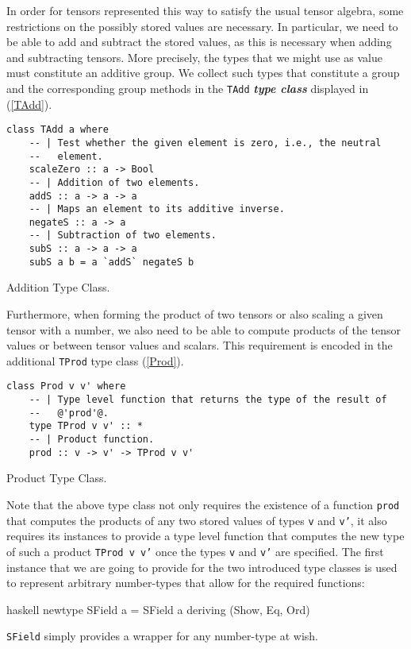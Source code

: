 In order for tensors represented this way to satisfy the usual tensor algebra, some restrictions on the possibly stored values are necessary. In particular, we need to be able to add and subtract the stored values, as this is necessary when adding and subtracting tensors.
More precisely, the types that we might use as value must constitute an additive group. 
We collect such types that constitute a group and the corresponding group methods in the \texttt{TAdd} \textit{\textbf{type class}} displayed in (\ref{TAdd}).

\begin{listing}[hbt!]
\begin{verbatim}
class TAdd a where
    -- | Test whether the given element is zero, i.e., the neutral
    --   element.
    scaleZero :: a -> Bool
    -- | Addition of two elements.
    addS :: a -> a -> a
    -- | Maps an element to its additive inverse.
    negateS :: a -> a
    -- | Subtraction of two elements.
    subS :: a -> a -> a
    subS a b = a `addS` negateS b
\end{verbatim} 
\caption{Addition Type Class.}\label{TAdd}
\end{listing}

Furthermore, when forming the product of two tensors or also scaling a given tensor with a number, we also need to be able to compute products of the tensor values or between tensor values and scalars. This requirement is encoded in the additional \texttt{TProd} type class (\ref{Prod}).

\begin{listing}[hbt!] 
\begin{verbatim}
class Prod v v' where
    -- | Type level function that returns the type of the result of
    --   @'prod'@.
    type TProd v v' :: *
    -- | Product function.
    prod :: v -> v' -> TProd v v'
\end{verbatim} 
\caption{Product Type Class.}\label{Prod}
\end{listing}

Note that the above type class not only requires the existence of a function \texttt{prod} that computes the products of any two stored values of types \texttt{v} and \texttt{v'}, it also requires its instances to provide a type level function that computes the new type of such a product \texttt{TProd v v'} once the types \texttt{v} and \texttt{v'} are specified.
The first instance that we are going to provide for the two introduced type classes is used to represent arbitrary number-types that allow for the required functions:
\begin{center}
\begin{cminted}{haskell}
newtype SField a = SField a deriving (Show, Eq, Ord)
\end{cminted} 
\end{center}
\texttt{SField} simply provides a wrapper for any number-type at wish.

